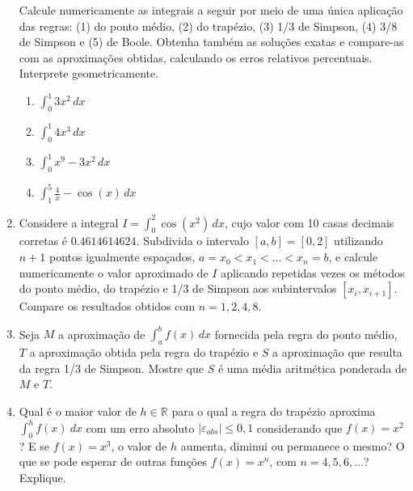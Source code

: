 \documentclass[12pt,a4paper]{article}
\begin{document}
\begin{enumerate}
Calcule numericamente as integrais a seguir por meio de uma única aplicação das regras: (1) do ponto médio, (2) do trapézio, (3) 1/3 de Simpson, (4) 3/8 de Simpson e (5) de Boole. Obtenha também as soluções exatas e compare-as com as aproximações obtidas, calculando os erros relativos percentuais. Interprete geometricamente.
\begin{multicols}{4}
\begin{enumerate}
\item $\int_0^1 3x^2 \,dx$
\item $\int_0^1 4x^3 \,dx$
\item $\int_{0}^1 x^9 - 3x^2 \,dx$
\item $\int_{1}^5 \frac{4}{x} - \cos(x) \,dx$
\end{enumerate}
\end{multicols}

\item Considere a integral $I = \int_0^2 \cos(x^2)\, dx$, cujo valor com 10 casas decimais corretas é $0.4614614624$. Subdivida o intervalo $[a, b] = [0, 2]$ utilizando $n+1$ pontos igualmente espaçados, $a = x_0 < x_1 < \ldots < x_n = b$, e calcule numericamente o valor aproximado de $I$ aplicando repetidas vezes os métodos do ponto médio, do trapézio e 1/3 de Simpson aos subintervalos $[x_i,x_{i+1}]$. Compare os resultados obtidos com $n = 1, 2, 4, 8$.

\item Seja $M$ a aproximação de $\int_a^b f(x)\, dx$ fornecida pela regra do ponto médio, $T$ a aproximação obtida pela regra do trapézio e $S$ a aproximação que resulta da regra 1/3 de Simpson. Mostre que $S$ é uma média aritmética ponderada de $M$ e $T$.

\item Qual é o maior valor de $h \in \mathbb{R}$ para o qual a regra do trapézio aproxima $\int_0^h f(x) \ dx$ com um erro absoluto $|\varepsilon_{abs}| \leq 0,1$ considerando que $f(x) = x^2$? E se $f(x) = x^3$, o valor de $h$ aumenta, diminui ou permanece o mesmo? O que se pode esperar de outras funções $f(x) = x^n$, com $n = 4,5,6,\ldots$? Explique.


\end{enumerate}
\end{document}
